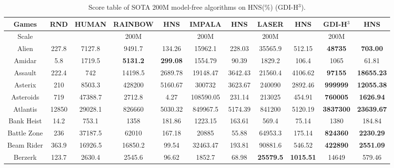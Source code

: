 \documentclass[nohyperref]{article}
\theoremstyle{plain}
\begin{document}
\begin{table}[!hb]
\footnotesize
\begin{center}
\caption{Score table of SOTA 200M model-free algorithms on HNS(\%) (GDI-H$^3$).}
\setlength{\tabcolsep}{1.0pt}
\begin{tabular}{ |c| c| c| c c| c c| c c| c c|}
\hline
Games & RND & HUMAN & RAINBOW & HNS & IMPALA & HNS & LASER & HNS  & GDI-H$^3$ & HNS\\
\hline
Scale  &     &       & 200M   &       &  200M    &        & 200M   &         &  200M   &\\
\hline
 Alien  & 227.8 & 7127.8            & 9491.7 & 134.26 & 15962.1  & 228.03 & 35565.9 & 512.15                                 &\textbf{48735}             &\textbf{703.00}      \\
 Amidar & 5.8   & 1719.5            & \textbf{5131.2} & \textbf{299.08} & 1554.79  & 90.39  & 1829.2  & 106.4                 &1065                       &61.81       \\
 Assault & 222.4 & 742              & 14198.5 & 2689.78 & 19148.47 & 3642.43  & 21560.4 & 4106.62                         &\textbf{97155}             &\textbf{18655.23}    \\
 Asterix & 210   & 8503.3           & 428200 & 5160.67 & 300732   & 3623.67  & 240090  & 2892.46                          &\textbf{999999}            &\textbf{12055.38}    \\
 Asteroids & 719 & 47388.7          & 2712.8 & 4.27   & 108590.05 & 231.14  & 213025  &  454.91                          &\textbf{760005 }           &\textbf{1626.94}     \\
 Atlantis & 12850 & 29028.1         & 826660 & 5030.32 & 849967.5 & 5174.39 & 841200 & 5120.19                            &\textbf{3837300}           &\textbf{23639.67}     \\
 Bank Heist & 14.2 & 753.1          & 1358   & 181.86  & 1223.15  & 163.61  & 569.4  & 75.14                         &1380                       &184.84       \\
 Battle Zone & 236 & 37187.5        & 62010 & 167.18  & 20885    & 55.88  & 64953.3 & 175.14                                &\textbf{824360}            &\textbf{2230.29}      \\
 Beam Rider & 363.9 & 16926.5       & 16850.2 & 99.54 & 32463.47 & 193.81 & 90881.6 & 546.52                                &\textbf{422890}            &\textbf{2551.09}      \\
 Berzerk & 123.7 & 2630.4           & 2545.6   & 96.62  & 1852.7   & 68.98  & \textbf{25579.5} & \textbf{1015.51}           &14649             &579.46       \\

\end{tabular}
\end{center}
\end{table}
\end{document}
